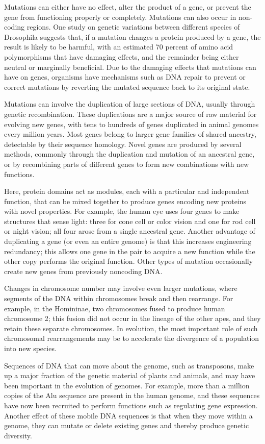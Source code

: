 Mutations can either have no effect, alter the product of a gene, or prevent the gene from functioning properly or completely. Mutations can also occur in non-coding regions. One study on genetic variations between different species of Drosophila suggests that, if a mutation changes a protein produced by a gene, the result is likely to be harmful, with an estimated 70 percent of amino acid polymorphisms that have damaging effects, and the remainder being either neutral or marginally beneficial. Due to the damaging effects that mutations can have on genes, organisms have mechanisms such as DNA repair to prevent or correct mutations by reverting the mutated sequence back to its original state.

Mutations can involve the duplication of large sections of DNA, usually through genetic recombination. These duplications are a major source of raw material for evolving new genes, with tens to hundreds of genes duplicated in animal genomes every million years. Most genes belong to larger gene families of shared ancestry, detectable by their sequence homology. Novel genes are produced by several methods, commonly through the duplication and mutation of an ancestral gene, or by recombining parts of different genes to form new combinations with new functions.

Here, protein domains act as modules, each with a particular and independent function, that can be mixed together to produce genes encoding new proteins with novel properties. For example, the human eye uses four genes to make structures that sense light: three for cone cell or color vision and one for rod cell or night vision; all four arose from a single ancestral gene. Another advantage of duplicating a gene (or even an entire genome) is that this increases engineering redundancy; this allows one gene in the pair to acquire a new function while the other copy performs the original function. Other types of mutation occasionally create new genes from previously noncoding DNA.

Changes in chromosome number may involve even larger mutations, where segments of the DNA within chromosomes break and then rearrange. For example, in the Homininae, two chromosomes fused to produce human chromosome 2; this fusion did not occur in the lineage of the other apes, and they retain these separate chromosomes. In evolution, the most important role of such chromosomal rearrangements may be to accelerate the divergence of a population into new species.

Sequences of DNA that can move about the genome, such as transposons, make up a major fraction of the genetic material of plants and animals, and may have been important in the evolution of genomes. For example, more than a million copies of the Alu sequence are present in the human genome, and these sequences have now been recruited to perform functions such as regulating gene expression. Another effect of these mobile DNA sequences is that when they move within a genome, they can mutate or delete existing genes and thereby produce genetic diversity.

